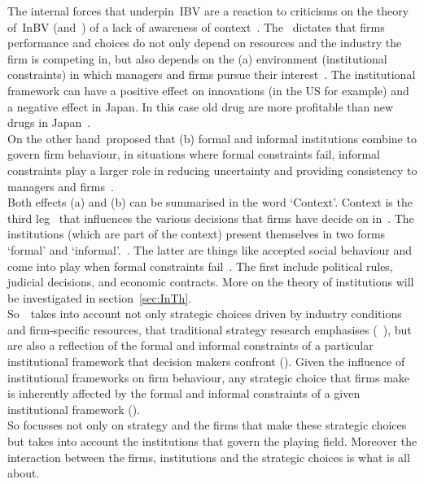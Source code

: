 The internal forces that underpin~\gls{IBV} are a reaction to criticisms on the theory of~\gls{InBV} (and~\rbv) of a lack of awareness of context~\cite{Narayanan:2005}.  
The \ibv~dictates that firms performance and choices do not only depend on resources and the industry the firm is competing in, but also depends on the (a) environment (institutional constraints) in which managers and firms pursue their interest~\cite{Peng:2008b}.%
The institutional framework can have a positive effect on innovations (in the US for example) and a negative effect in Japan. 
In this case old drug are more profitable than new drugs in Japan~\cite{Peng:2008b}. \\
On the other hand~\ibv proposed that (b) formal and informal institutions combine to govern firm behaviour, in situations where formal constraints fail, informal constraints play a larger role in reducing uncertainty and providing consistency to managers and firms~\cite{Peng:2008b}. \\
Both effects (a) and (b) can be summarised in the word `Context'. Context is the third leg~\cite{Peng:2009} that influences the various decisions that firms have decide on in~\ib. 
The institutions (which are part of the context) present themselves in two forms `formal' and `informal'.~\cite{Peng:2002}. The latter are things like accepted social behaviour and come into play when formal constraints fail~\cite{North:1990,DiMaggio:1983,Scott:1995}. The first include political rules, judicial decisions, and economic contracts. More on the theory of institutions will be investigated in section~\ref{sec:InTh}.\\
So~\ibv~takes into account not only strategic choices driven by industry conditions and firm-specific resources, that traditional strategy research emphasises (~\cite{Porter:1980,Barney:1991}), but are also a reflection of the formal and informal constraints of a particular institutional framework that decision makers confront (\cite{Oliver:1997,Scott:1995}). Given the influence of institutional frameworks on firm behaviour, any strategic choice that firms make is inherently affected by the formal and informal constraints of a given institutional framework (\cite{North:1990,Oliver:1997}). \\

So \ibv focusses not only on strategy and the firms that make these strategic choices but takes into account the institutions that govern the playing field. Moreover the interaction between the firms, institutions and the strategic choices is what \ibv is all about.\\
